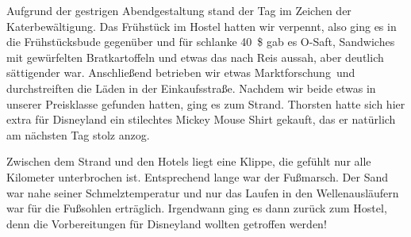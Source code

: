 Aufgrund der gestrigen Abendgestaltung stand der Tag im Zeichen der Katerbewältigung.
Das Frühstück im Hostel hatten wir verpennt, also ging es in die Frühstücksbude gegenüber und für schlanke 40~\$ gab es O-Saft, Sandwiches mit gewürfelten Bratkartoffeln und etwas das nach Reis aussah, aber deutlich sättigender war.
Anschließend betrieben wir etwas \glqq Marktforschung\grqq \, und durchstreiften die Läden in der Einkaufsstraße.
Nachdem wir beide etwas in unserer Preisklasse gefunden hatten, ging es zum Strand.
Thorsten hatte sich hier extra für Disneyland ein stilechtes Mickey Mouse Shirt gekauft, das er natürlich am nächsten Tag stolz anzog.

Zwischen dem Strand und den Hotels liegt eine Klippe, die gefühlt nur alle Kilometer unterbrochen ist.
Entsprechend lange war der Fußmarsch.
Der Sand war nahe seiner Schmelztemperatur und nur das Laufen in den Wellenausläufern war für die Fußsohlen erträglich.
Irgendwann ging es dann zurück zum Hostel, denn die Vorbereitungen für Disneyland wollten getroffen werden!


